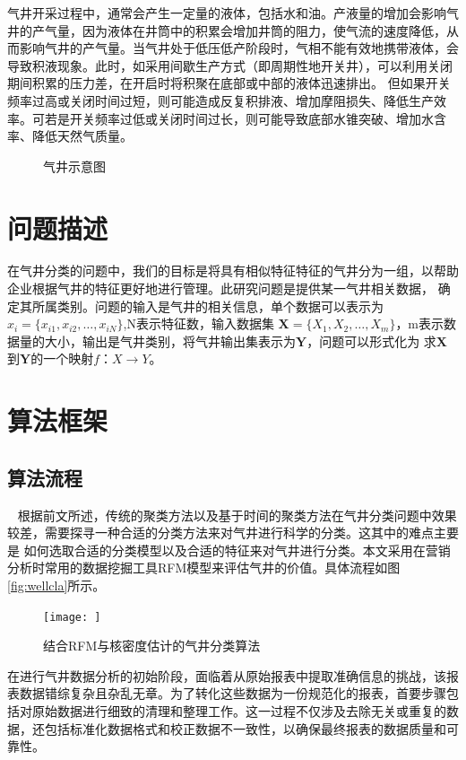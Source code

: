 气井开采过程中，通常会产生一定量的液体，包括水和油。产液量的增加会影响气井的产气量，因为液体在井筒中的积累会增加井筒的阻力，使气流的速度降低，从而影响气井的产气量。当气井处于低压低产阶段时，气相不能有效地携带液体，会导致积液现象。此时，如采用间歇生产方式（即周期性地开关井），可以利用关闭期间积累的压力差，在开启时将积聚在底部或中部的液体迅速排出。
但如果开关频率过高或关闭时间过短，则可能造成反复积排液、增加摩阻损失、降低生产效率。可若是开关频率过低或关闭时间过长，则可能导致底部水锥突破、增加水含率、降低天然气质量。
\begin{figure}[H]
    \centering
    \caption{气井示意图}
\end{figure}
\section{问题描述}
在气井分类的问题中，我们的目标是将具有相似特征特征的气井分为一组，以帮助企业根据气井的特征更好地进行管理。此研究问题是提供某一气井相关数据，
确定其所属类别。问题的输入是气井的相关信息，单个数据可以表示为$x_i = \{x_{i1}, x_{i2}, \ldots, x_{iN}\}$,N表示特征数，输入数据集
$\mathbf{X} = \{X_{1}, X_{2}, \ldots, X_{m}\}$，m表示数据量的大小，输出是气井类别，将气井输出集表示为$\mathbf{Y}$，问题可以形式化为
求$\mathbf{X}$到$\mathbf{Y}$的一个映射$f$：$X \rightarrow Y$。
\section{算法框架}
\subsection{算法流程}\
\label{sec:K-Shapeprocess}
根据前文所述，传统的聚类方法以及基于时间的聚类方法在气井分类问题中效果较差，需要探寻一种合适的分类方法来对气井进行科学的分类。这其中的难点主要是
如何选取合适的分类模型以及合适的特征来对气井进行分类。本文采用在营销分析时常用的数据挖掘工具RFM模型来评估气井的价值。具体流程如图\ref{fig:wellcla}所示。
\begin{figure}
    \centering
    \texttt{[image: ]}\\
    \caption{结合RFM与核密度估计的气井分类算法}
    \label{fig:K-Shape}
\end{figure}
在进行气井数据分析的初始阶段，面临着从原始报表中提取准确信息的挑战，该报表数据错综复杂且杂乱无章。为了转化这些数据为一份规范化的报表，首要步骤包括对原始数据进行细致的清理和整理工作。这一过程不仅涉及去除无关或重复的数据，还包括标准化数据格式和校正数据不一致性，以确保最终报表的数据质量和可靠性。

